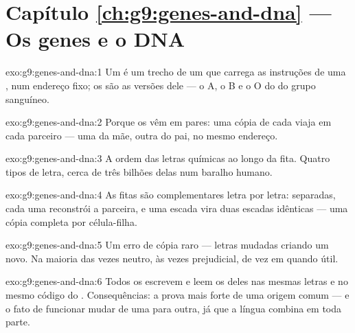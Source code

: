 \section*{Capítulo \ref{ch:g9:genes-and-dna} --- Os genes e o DNA}

\begin{solution}{exo:g9:genes-and-dna:1}
Um  é um trecho de um  que carrega as
instruções de uma , num endereço fixo; os
 são as versões dele --- o A, o B e o O do  do
grupo sanguíneo.
\end{solution}

\begin{solution}{exo:g9:genes-and-dna:2}
Porque os  vêm em pares: uma cópia de cada 
viaja em cada parceiro --- uma da mãe, outra do pai, no mesmo
endereço.
\end{solution}

\begin{solution}{exo:g9:genes-and-dna:3}
A ordem das letras químicas ao longo da fita. Quatro tipos de
letra, cerca de três bilhões delas num baralho humano.
\end{solution}

\begin{solution}{exo:g9:genes-and-dna:4}
As fitas são complementares letra por letra: separadas, cada
uma reconstrói a parceira, e uma escada vira duas escadas
idênticas --- uma cópia completa por célula-filha.
\end{solution}

\begin{solution}{exo:g9:genes-and-dna:5}
Um erro de cópia raro --- letras mudadas criando um 
novo. Na maioria das vezes neutro, às vezes prejudicial, de
vez em quando útil.
\end{solution}

\begin{solution}{exo:g9:genes-and-dna:6}
Todos os  escrevem e leem os  deles nas
mesmas letras e no mesmo código do . Consequências: a
prova mais forte de uma origem comum --- e o fato de
funcionar mudar  de uma  para outra, já que a
língua combina em toda parte.
\end{solution}

